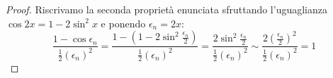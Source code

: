 \begin{proof}
Riscrivamo la seconda proprietà enunciata sfruttando l'uguaglianza $\cos 2x = 1 - 2\sin^2x$ e ponendo $\epsilon_n = 2x$:
\begin{equation*}
\frac{1-\cos \epsilon_n}{\frac{1}{2}(\epsilon_n)^2} = \frac{1 - (1-2\sin^2 \frac{\epsilon_n}{2})}{\frac{1}{2}(\epsilon_n)^2} = \frac{2\sin^2 \frac{\epsilon_n}{2}}{\frac{1}{2}(\epsilon_n)^2} \sim \frac{2(\frac{\epsilon_n}{2})^2}{\frac{1}{2}(\epsilon_n)^2} = 1
\end{equation*}
\end{proof}